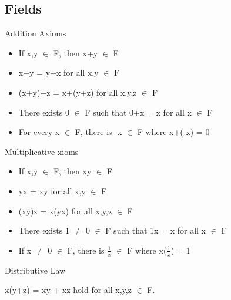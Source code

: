 \subsection{Fields}

Addition Axioms
	\begin{itemize}[leftmargin=1cm]
		\item If x,y $\in$ F, then x+y $\in$ F
	
		\item x+y = y+x for all x,y $\in$ F
	
		\item (x+y)+z = x+(y+z) for all x,y,z $\in$ F
	
		\item There exists 0 $\in$ F such that 0+x = x for all x $\in$ F
	
		\item For every x $\in$ F, there is -x $\in$ F where x+(-x) = 0
	\end{itemize}

Multiplicative xioms
	\begin{itemize}[leftmargin=1cm]
		\item If x,y $\in$ F, then xy $\in$ F
	
		\item yx = xy for all x,y $\in$ F
	
		\item (xy)z = x(yx) for all x,y,z $\in$ F
	
		\item There exists 1 $\not =$ 0 $\in$ F such that 1x = x for all x $\in$ F
	
		\item If x $\not =$ 0 $\in$ F, there is $\frac{1}{x}$ $\in$ F where x($\frac{1}{x}$) = 1
	\end{itemize}

Distributive Law

	\qquad x(y+z) = xy + xz hold for all x,y,z $\in$ F. \\

